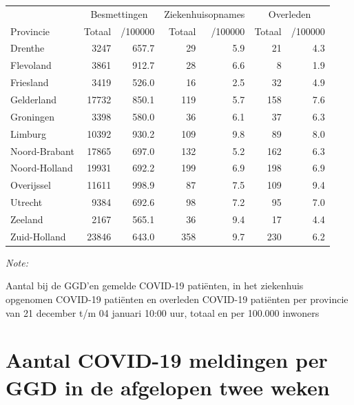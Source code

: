 \documentclass[
  english,
  man,floatsintext]{apa6}
\begin{document}
\begin{table}[H]
\centering
\begin{threeparttable}
\begin{tabular}{lrrrrrr}
\toprule
\multicolumn{1}{c}{ } & \multicolumn{2}{c}{Besmettingen} & \multicolumn{2}{c}{Ziekenhuisopnames} & \multicolumn{2}{c}{Overleden} \\
\cmidrule(l{3pt}r{3pt}){2-3} \cmidrule(l{3pt}r{3pt}){4-5} \cmidrule(l{3pt}r{3pt}){6-7}
Provincie & Totaal & /100000 & Totaal & /100000 & Totaal & /100000\\
\midrule
Drenthe & 3247 & 657.7 & 29 & 5.9 & 21 & 4.3\\
Flevoland & 3861 & 912.7 & 28 & 6.6 & 8 & 1.9\\
Friesland & 3419 & 526.0 & 16 & 2.5 & 32 & 4.9\\
Gelderland & 17732 & 850.1 & 119 & 5.7 & 158 & 7.6\\
Groningen & 3398 & 580.0 & 36 & 6.1 & 37 & 6.3\\
Limburg & 10392 & 930.2 & 109 & 9.8 & 89 & 8.0\\
Noord-Brabant & 17865 & 697.0 & 132 & 5.2 & 162 & 6.3\\
Noord-Holland & 19931 & 692.2 & 199 & 6.9 & 198 & 6.9\\
Overijssel & 11611 & 998.9 & 87 & 7.5 & 109 & 9.4\\
Utrecht & 9384 & 692.6 & 98 & 7.2 & 95 & 7.0\\
Zeeland & 2167 & 565.1 & 36 & 9.4 & 17 & 4.4\\
Zuid-Holland & 23846 & 643.0 & 358 & 9.7 & 230 & 6.2\\
\bottomrule
\end{tabular}
\begin{tablenotes}
\item \textit{Note: } 
\item Aantal bij de GGD’en gemelde COVID-19 patiënten, in het ziekenhuis opgenomen COVID-19 patiënten en overleden COVID-19 patiënten per provincie van 21 december t/m 04 januari 10:00 uur, totaal en per 100.000 inwoners
\end{tablenotes}
\end{threeparttable}
\end{table}

\newpage

\hypertarget{aantal-covid-19-meldingen-per-ggd-in-de-afgelopen-twee-weken}{%
\section{Aantal COVID-19 meldingen per GGD in de afgelopen twee weken}\label{aantal-covid-19-meldingen-per-ggd-in-de-afgelopen-twee-weken}}
\end{document}
